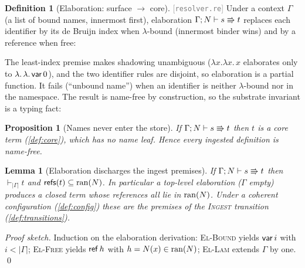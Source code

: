 \documentclass[11pt]{article}
\theoremstyle{definition}
\newtheorem{definition}{Definition}[section]
\theoremstyle{plain}
\newtheorem{lemma}[theorem]{Lemma}
\newtheorem{proposition}[theorem]{Proposition}
\theoremstyle{remark}
\newcommand{\src}[1]{{\footnotesize\textcolor{gray}{[\texttt{#1}]}}}
\begin{document}
\begin{definition}[Elaboration: surface $\to$ core]\label{def:elab}
\src{resolver.re} Under a context $\Gamma$ (a list of bound names, innermost first),
elaboration $\Gamma;N \vdash s \Rrightarrow t$ replaces each identifier by its de Bruijn
index when $\lambda$-bound (innermost binder wins) and by a reference when free:
The least-index premise makes shadowing unambiguous ($\lambda x.\lambda x.\,x$ elaborates only
to $\lambda.\,\lambda.\,\mathsf{var}\,0$), and the two identifier rules are disjoint, so elaboration is a
partial function. It fails (``unbound name'') when an identifier is neither $\lambda$-bound
nor in the namespace. The result is name-free by construction, so the substrate invariant is
a typing fact:
\end{definition}

\begin{proposition}[Names never enter the store]\label{prop:namefree}
If $\Gamma;N \vdash s \Rrightarrow t$ then $t$ is a core term (\cref{def:core}), which has
no name leaf. Hence every ingested definition is name-free.
\end{proposition}

\begin{lemma}[Elaboration discharges the ingest premises]\label{lem:elab-premises}
If $\Gamma;N \vdash s \Rrightarrow t$ then $\vdash_{|\Gamma|} t$ and
$\mathsf{refs}(t) \subseteq \operatorname{ran}(N)$. In particular a top-level elaboration ($\Gamma$ empty)
produces a closed term whose references all lie in $\operatorname{ran}(N)$. Under a coherent
configuration (\cref{def:config}) these are the premises of the \textsc{Ingest} transition
(\cref{def:transitions}).
\end{lemma}
\begin{proof}[Proof sketch]
Induction on the elaboration derivation: \textsc{El-Bound} yields $\mathsf{var}\,i$ with $i < |\Gamma|$;
\textsc{El-Free} yields $\mathsf{ref}\,h$ with $h = N(x) \in \operatorname{ran}(N)$; \textsc{El-Lam}
extends $\Gamma$ by one. \qed
\end{proof}
\end{document}
